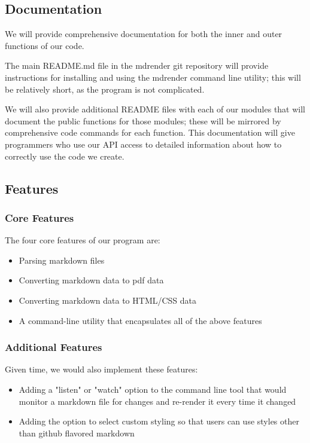 \subsection{Documentation}

We will provide comprehensive documentation for both the inner and outer functions of our code.

The main README.md file in the mdrender git repository will provide instructions for installing and using the mdrender command line utility; this will be relatively short, as the program is not complicated.

We will also provide additional README files with each of our modules that will document the public functions for those modules; these will be mirrored by comprehensive code commands for each function. This documentation will give programmers who use our API access to detailed information about how to correctly use the code we create.

\subsection{Features}

\subsubsection{Core Features}

The four core features of our program are:
\begin{itemize}
  \item Parsing markdown files
  \item Converting markdown data to pdf data
  \item Converting markdown data to HTML/CSS data
  \item A command-line utility that encapsulates all of the above features
\end{itemize}

\subsubsection{Additional Features}
Given time, we would also implement these features:
\begin{itemize}
  \item Adding a "listen" or "watch" option to the command line tool that would monitor a markdown file for changes and re-render it every time it changed
  \item Adding the option to select custom styling so that users can use styles other than github flavored markdown
\end{itemize}
